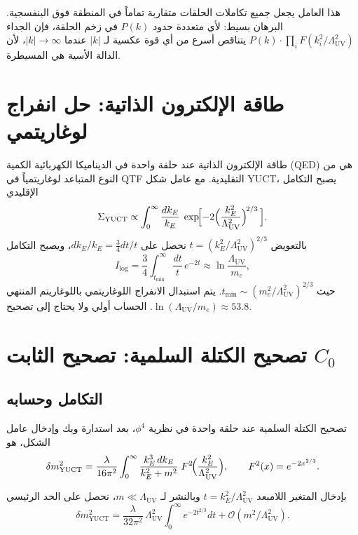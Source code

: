 \documentclass[11pt,a4paper]{article}
\newcommand{\LUV}{\Lambda_{\mathrm{UV}}}
\theoremstyle{remark}
\begin{document}
\begin{otherlanguage}{arabic}
		هذا العامل يجعل جميع تكاملات الحلقات متقاربة تماماً في المنطقة فوق البنفسجية. البرهان بسيط: لأي متعددة حدود \(P(k)\) في زخم الحلقة، فإن الجداء \(P(k) \cdot \prod_i F(k_i^2/\LUV^2)\) يتناقص أسرع من أي قوة عكسية لـ \(|k|\) عندما \(|k| \to \infty\)، لأن الدالة الأسية هي المسيطرة.
		
		\section{طاقة الإلكترون الذاتية: حل انفراج لوغاريتمي}
		\label{sec:electron}
		
		طاقة الإلكترون الذاتية عند حلقة واحدة في الديناميكا الكهربائية الكمية (QED) هي من النوع المتباعد لوغاريتمياً في QTF التقليدية. مع عامل شكل YUCT، يصبح التكامل الإقليدي
		\begin{equation}
			\Sigma_{\mathrm{YUCT}} \propto \int_0^{\infty} \frac{dk_E}{k_E}\; \exp\!\Bigl[-2\Bigl(\frac{k_E^2}{\LUV^2}\Bigr)^{\!2/3}\,\Bigr].
			\label{eq:elec_int}
		\end{equation}
		بالتعويض \(t = (k_E^2/\LUV^2)^{2/3}\) نحصل على \(dk_E/k_E = \frac{3}{4} dt/t\)، ويصبح التكامل
		\begin{equation}
			I_{\mathrm{log}} = \frac{3}{4} \int_{t_{\min}}^{\infty} \frac{dt}{t}\, e^{-2t} \approx \ln\frac{\LUV}{m_e},
			\label{eq:elec_result}
		\end{equation}
		حيث \(t_{\min} \sim (m_e^2/\LUV^2)^{2/3}\). يتم استبدال الانفراج اللوغاريتمي باللوغاريتم المنتهي \(\ln(\LUV/m_e) \approx 53.8\). الحساب أولي ولا يحتاج إلى تصحيح.
		
		\section{تصحيح الكتلة السلمية: تصحيح الثابت \(C_0\)}
		\label{sec:scalar}
		
		\subsection{التكامل وحسابه}
		تصحيح الكتلة السلمية عند حلقة واحدة في نظرية \(\phi^4\)، بعد استدارة ويك وإدخال عامل الشكل، هو
		\begin{equation}
			\delta m^2_{\mathrm{YUCT}} = \frac{\lambda}{16\pi^2} \int_0^{\infty} \frac{k_E^3\, dk_E}{k_E^2 + m^2}\; F^2\!\Bigl(\frac{k_E^2}{\LUV^2}\Bigr), \qquad F^2(x) = e^{-2x^{2/3}}.
			\label{eq:scalar_YUCT}
		\end{equation}
		
		بإدخال المتغير اللامبعد \(t = k_E^2/\LUV^2\) وبالنشر لـ \(m \ll \LUV\)، نحصل على الحد الرئيسي
		\begin{equation}
			\delta m^2_{\mathrm{YUCT}} = \frac{\lambda}{32\pi^2}\,\LUV^2 \int_0^{\infty} e^{-2t^{2/3}} dt + \mathcal{O}(m^2/\LUV^2).
			\label{eq:scalar_lead}
		\end{equation}
		

\end{otherlanguage}
\end{document}
